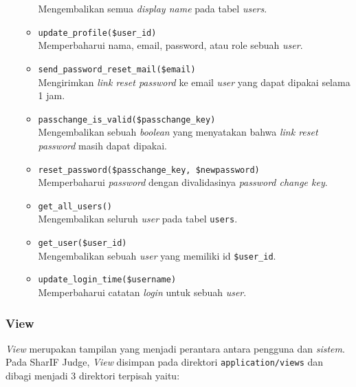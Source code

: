 \begin{itemize}
\begin{itemize}
                        Mengembalikan semua \textit{display name} pada tabel \textit{users}.
                  \item \verb|update_profile($user_id)| \\
                        Memperbaharui nama, email, password, atau role sebuah \textit{user}.
                  \item \verb|send_password_reset_mail($email)| \\
                        Mengirimkan \textit{link reset password} ke email \textit{user} yang dapat dipakai selama 1 jam.
                  \item \verb|passchange_is_valid($passchange_key)| \\
                        Mengembalikan sebuah \textit{boolean} yang menyatakan bahwa \textit{link reset password} masih dapat dipakai.
                  \item \verb|reset_password($passchange_key, $newpassword)| \\
                        Memperbaharui \textit{password} dengan divalidasinya \textit{password change key}.
                  \item \verb|get_all_users()| \\
                        Mengembalikan seluruh \textit{user} pada tabel \verb|users|.
                  \item \verb|get_user($user_id)| \\
                        Mengembalikan sebuah \textit{user} yang memiliki id \verb|$user_id|.
                  \item \verb|update_login_time($username)| \\
                        Memperbaharui catatan \textit{login} untuk sebuah \textit{user}.
            \end{itemize}


\end{itemize}

\subsubsection{View}
\label{sub:3:1:1:view}

\textit{View} merupakan tampilan yang menjadi perantara antara pengguna dan \textit{sistem}. Pada SharIF Judge, \textit{View} disimpan pada direktori \verb|application/views| dan dibagi menjadi 3 direktori terpisah yaitu:

